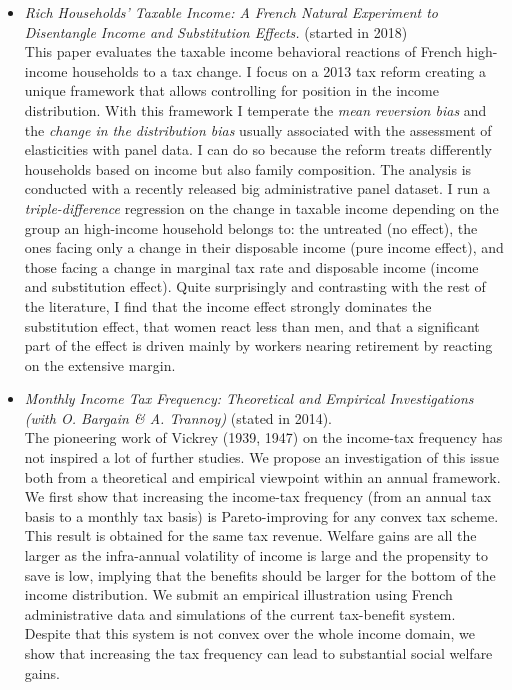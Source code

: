 \documentclass[a4paper,11pt]{article} %
\begin{document}
\begin{itemize}
\item  {\emph{Rich Households' Taxable Income: A French Natural Experiment to Disentangle Income and Substitution Effects.}} (started in 2018) \\ 
  This paper evaluates the taxable income behavioral reactions of French high-income households to a tax change. I focus on a 2013 tax reform creating a unique framework that allows controlling for position in the income distribution. With this framework I temperate the \emph{mean reversion bias} and the  \emph{change in the distribution bias} usually associated with  the assessment of elasticities with panel data. I can do so because the reform treats differently households based on income but also family composition. The   analysis is conducted with a recently released big administrative panel dataset. I run a \emph{triple-difference} regression on the  change in taxable income depending on the group an high-income household belongs to: the untreated (no effect), the ones facing only a change in their disposable  income (pure income effect), and those facing a change in marginal tax rate and disposable income (income and substitution effect). Quite surprisingly and contrasting with the rest of the literature, I find that the income effect strongly dominates the substitution effect, that women react less than men, and that a significant part of the effect is driven mainly by workers nearing retirement by reacting on the extensive margin.

\item{\emph{Monthly Income Tax Frequency: Theoretical and Empirical Investigations (with O. Bargain \& A. Trannoy)}} (stated in 2014). \\
The pioneering work of Vickrey  (1939, 1947) on the income-tax frequency has not inspired a lot of further studies. We propose an investigation of this issue both from a theoretical and empirical viewpoint within an annual framework. We first show that increasing the income-tax frequency (from an annual tax basis to a monthly tax basis) is Pareto-improving for any convex tax scheme. This result is obtained for the same tax revenue. Welfare gains are all the larger as the infra-annual volatility of income is large and the propensity to save is low, implying that the benefits should be larger for the bottom of the income distribution. We submit an empirical illustration using French administrative data and simulations of the current tax-benefit system. Despite that this system is not convex over the whole income domain, we show that increasing the tax frequency can lead to substantial social welfare gains. 


\end{itemize}
\end{document}
